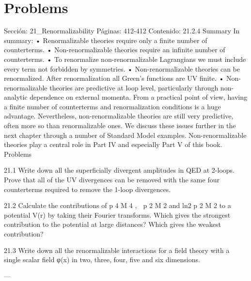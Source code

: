 \section*{Problems}
Sección: 21_Renormalizability
Páginas: 412-412
Contenido:
21.2.4 Summary
In summary:
• Renormalizable theories require only a ﬁnite number of counterterms.
• Non-renormalizable theories require an inﬁnite number of counterterms.
• To renormalize non-renormalizable Lagrangians we must include every term not
forbidden by symmetries.
• Non-renormalizable theories can be renormalized. After renormalization all Green’s
functions are UV ﬁnite.
• Non-renormalizable theories are predictive at loop level, particularly through non-
analytic dependence on external momenta.
From a practical point of view, having a ﬁnite number of counterterms and renormalization
conditions is a huge advantage. Nevertheless, non-renormalizable theories are still very
predictive, often more so than renormalizable ones. We discuss these issues further in the
next chapter through a number of Standard Model examples. Non-renormalizable theories
play a central role in Part IV and especially Part V of this book.
Problems

21.1 Write down all the superﬁcially divergent amplitudes in QED at 2-loops. Prove that
all of the UV divergences can be removed with the same four counterterms required
to remove the 1-loop divergences.

21.2 Calculate the contributions of
⃗p 4
M 4 ,

⃗p 2
M 2 and ln2 ⃗p 2
M 2 to a potential V(r) by taking
their Fourier transforms. Which gives the strongest contribution to the potential at
large distances? Which gives the weakest contribution?

21.3 Write down all the renormalizable interactions for a ﬁeld theory with a single scalar
ﬁeld φ(x) in two, three, four, ﬁve and six dimensions.


---

